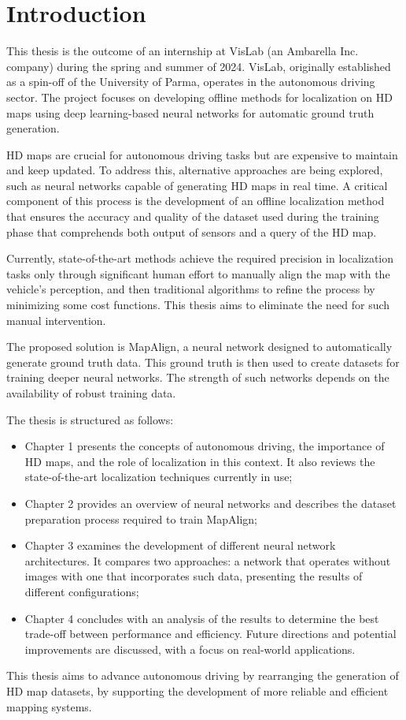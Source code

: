 \NoBgThispage
\chapter*{Introduction}

This thesis is the outcome of an internship at VisLab (an Ambarella Inc. company) during the spring and summer of 2024. VisLab, originally established as a spin-off of the University of Parma, operates in the autonomous driving sector. The project focuses on developing offline methods for localization on HD maps using deep learning-based neural networks for automatic ground truth generation.

HD maps are crucial for autonomous driving tasks but are expensive to maintain and keep updated. To address this, alternative approaches are being explored, such as neural networks capable of generating HD maps in real time. A critical component of this process is the development of an offline localization method that ensures the accuracy and quality of the dataset used during the training phase that comprehends both output of sensors and a query of the HD map.

Currently, state-of-the-art methods achieve the required precision in localization tasks only through significant human effort to manually align the map with the vehicle’s perception, and then traditional algorithms to refine the process by minimizing some cost functions. This thesis aims to eliminate the need for such manual intervention.

The proposed solution is MapAlign, a neural network designed to automatically generate ground truth data. This ground truth is then used to create datasets for training deeper neural networks. The strength of such networks depends on the availability of robust training data.

The thesis is structured as follows:
\begin{itemize}
    \item Chapter 1 presents the concepts of autonomous driving, the importance of HD maps, and the role of localization in this context. It also reviews the state-of-the-art localization techniques currently in use;
    \item Chapter 2 provides an overview of neural networks and describes the dataset preparation process required to train MapAlign;
    \item Chapter 3 examines the development of different neural network architectures. It compares two approaches: a network that operates without images with one that incorporates such data, presenting the results of different configurations;
    \item Chapter 4 concludes with an analysis of the results to determine the best trade-off between performance and efficiency. Future directions and potential improvements are discussed, with a focus on real-world applications.

\end{itemize}

This thesis aims to advance autonomous driving by rearranging the generation of HD map datasets, by supporting the development of more reliable and efficient mapping systems.
